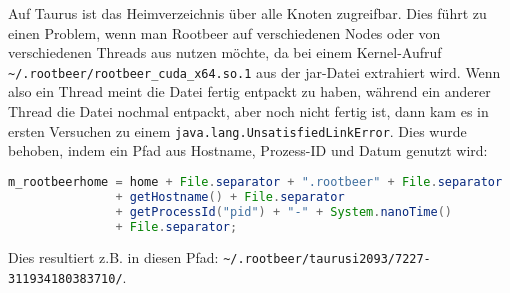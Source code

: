 Auf Taurus ist das Heimverzeichnis über alle Knoten zugreifbar. Dies führt zu einen Problem, wenn man Rootbeer auf verschiedenen Nodes oder von verschiedenen Threads aus nutzen möchte, da bei einem Kernel-Aufruf \lstinline!~/.rootbeer/rootbeer_cuda_x64.so.1! aus der jar-Datei extrahiert wird. Wenn also ein Thread meint die Datei fertig entpackt zu haben, während ein anderer Thread die Datei nochmal entpackt, aber noch nicht fertig ist, dann kam es in ersten Versuchen zu einem \texttt{java.lang.UnsatisfiedLinkError}. Dies wurde behoben, indem ein Pfad aus Hostname, Prozess-ID und Datum genutzt wird:
\begin{lstlisting}[language=Java]
m_rootbeerhome = home + File.separator + ".rootbeer" + File.separator
               + getHostname() + File.separator
               + getProcessId("pid") + "-" + System.nanoTime()
               + File.separator;
\end{lstlisting}\vspace{-1.5\baselineskip}
Dies resultiert z.B. in diesen Pfad: \lstinline!~/.rootbeer/taurusi2093/7227-311934180383710/!.


